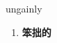 
\begin{frame}
{\huge ungainly}
\begin{center}
\begin{enumerate}\Large
  \item \textbf{笨拙的}
\end{enumerate}
\end{center}
\end{frame}
